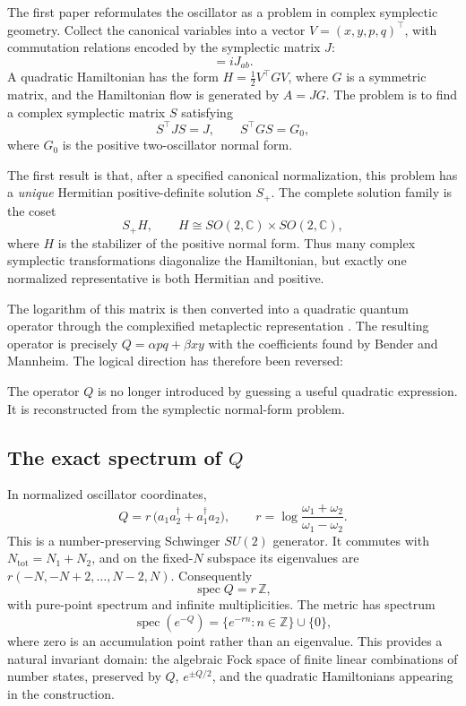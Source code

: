 \documentclass[11pt]{article}
\theoremstyle{remark}
\newcommand{\C}{\mathbb{C}}
\newcommand{\Z}{\mathbb{Z}}
\newcommand{\w}{\omega}
\newcommand{\dg}{\dagger}
\newcommand{\keybox}[1]{\begin{center}%
\fbox{\parbox{0.86\linewidth}{\centering #1}}\end{center}}
\begin{document}
The first paper \cite{paperI} reformulates the oscillator as a problem in
complex symplectic geometry.  Collect the canonical variables into a
vector $V=(x,y,p,q)^{\top}$, with commutation relations encoded by the
symplectic matrix $J$:
\begin{equation}
[V_a,V_b]=iJ_{ab}.
\end{equation}
A quadratic Hamiltonian has the form $H=\tfrac12V^{\top}GV$, where $G$ is
a symmetric matrix, and the Hamiltonian flow is generated by $A=JG$.  The
problem is to find a complex symplectic matrix $S$ satisfying
\begin{equation}
S^{\top}JS=J,
\qquad
S^{\top}GS=G_0,
\end{equation}
where $G_0$ is the positive two-oscillator normal form.

The first result is that, after a specified canonical normalization, this
problem has a \emph{unique} Hermitian positive-definite solution $S_+$.
The complete solution family is the coset
\begin{equation}
S_+H,\qquad H\cong SO(2,\C)\times SO(2,\C),
\end{equation}
where $H$ is the stabilizer of the positive normal form.  Thus many
complex symplectic transformations diagonalize the Hamiltonian, but
exactly one normalized representative is both Hermitian and positive.

The logarithm of this matrix is then converted into a quadratic quantum
operator through the complexified metaplectic representation
\cite{Folland}.  The resulting operator is precisely
$Q=\alpha pq+\beta xy$ with the coefficients found by Bender and
Mannheim.  The logical direction has therefore been reversed:
\keybox{$(G,\,J,\,G_0)\ \longrightarrow\ S_+\ \longrightarrow\ Q.$}
The operator $Q$ is no longer introduced by guessing a useful quadratic
expression.  It is reconstructed from the symplectic normal-form problem.

\subsection{The exact spectrum of \texorpdfstring{$Q$}{Q}}

In normalized oscillator coordinates,
\begin{equation}
Q=r\,\big(a_1a_2^{\dg}+a_1^{\dg}a_2\big),
\qquad
r=\log\frac{\w_1+\w_2}{\w_1-\w_2}.
\end{equation}
This is a number-preserving Schwinger $SU(2)$ generator.  It commutes
with $N_{\mathrm{tot}}=N_1+N_2$, and on the fixed-$N$ subspace its
eigenvalues are $r(-N,-N+2,\dots,N-2,N)$.  Consequently
\begin{equation}
\operatorname{spec}Q=r\,\Z,
\end{equation}
with pure-point spectrum and infinite multiplicities.  The metric has
spectrum
\begin{equation}
\operatorname{spec}(e^{-Q})=\{e^{-rn}:n\in\Z\}\cup\{0\},
\end{equation}
where zero is an accumulation point rather than an eigenvalue.  This
provides a natural invariant domain: the algebraic Fock space of finite
linear combinations of number states, preserved by $Q$, $e^{\pm Q/2}$,
and the quadratic Hamiltonians appearing in the construction.
\end{document}
